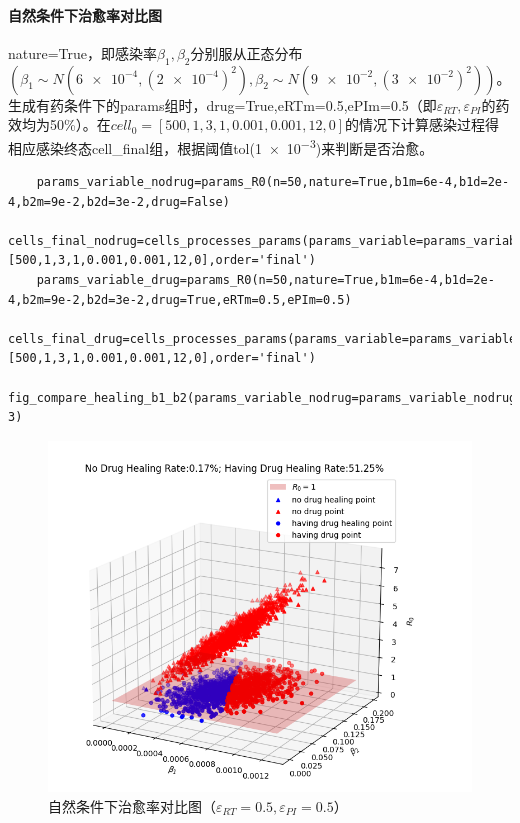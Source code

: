 \documentclass{ctexart}
\begin{document}
    \paragraph{自然条件下治愈率对比图}
    nature=True，即感染率$\beta_{1},\beta_{2}$分别服从正态分布$(\beta_{1}\sim N(\num{6e-4},(\num{2e-4})^{2}),\beta_{2}\sim N(\num{9e-2},(\num{3e-2})^{2}))$。生成有药条件下的params组时，drug=True,eRTm=0.5,ePIm=0.5（即$\varepsilon _{RT},\varepsilon _{PI}$的药效均为50\%）。在$cell_{0}=[500,1,3,1,0.001,0.001,12,0]$的情况下计算感染过程得相应感染终态cell\_final组，根据阈值tol(\num{1e-3})来判断是否治愈。
\begin{lstlisting}
    params_variable_nodrug=params_R0(n=50,nature=True,b1m=6e-4,b1d=2e-4,b2m=9e-2,b2d=3e-2,drug=False)
    cells_final_nodrug=cells_processes_params(params_variable=params_variable_nodrug,cell0=[500,1,3,1,0.001,0.001,12,0],order='final')
    params_variable_drug=params_R0(n=50,nature=True,b1m=6e-4,b1d=2e-4,b2m=9e-2,b2d=3e-2,drug=True,eRTm=0.5,ePIm=0.5)
    cells_final_drug=cells_processes_params(params_variable=params_variable_drug,cell0=[500,1,3,1,0.001,0.001,12,0],order='final')
    fig_compare_healing_b1_b2(params_variable_nodrug=params_variable_nodrug,cells_final_nodrug=cells_final_nodrug,params_variable_drug=params_variable_drug,cells_final_drug=cells_final_drug,tol=1e-3)
\end{lstlisting}
\begin{figure}[H]
    \centering
    \includegraphics[width=0.8\linewidth]{6.2.1.png}
    \caption{自然条件下治愈率对比图（$\varepsilon _{RT}=0.5,\varepsilon _{PI}=0.5$）}
    \label{fig.6.2.1}
\end{figure}
\end{document}
